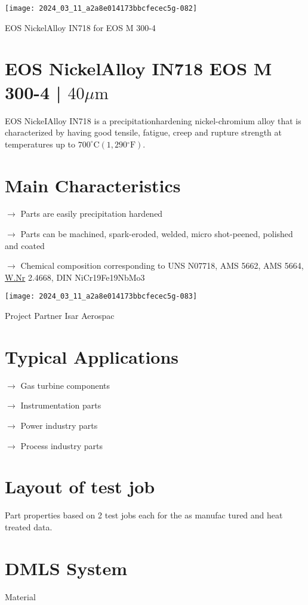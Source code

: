 \documentclass[10pt]{article}
\begin{document}
\begin{center}
\texttt{[image: 2024\_03\_11\_a2a8e014173bbcfecec5g-082]}
\end{center}

EOS NickelAlloy IN718 for EOS M 300-4

\section*{EOS NickelAlloy IN718 EOS M 300-4 | $40 \mu \mathrm{m}$}
EOS NickeIAlloy IN718 is a precipitationhardening nickel-chromium alloy that is characterized by having good tensile, fatigue, creep and rupture strength at temperatures up to $700^{\circ} \mathrm{C}\left(1,290{ }^{\circ} \mathrm{F}\right)$.

\section*{Main Characteristics}
$\longrightarrow$ Parts are easily precipitation hardened

$\longrightarrow$ Parts can be machined, spark-eroded, welded, micro shot-peened, polished and coated

$\longrightarrow$ Chemical composition corresponding to UNS N07718, AMS 5662, AMS 5664, \href{http://W.Nr}{W.Nr} 2.4668, DIN NiCr19Fe19NbMo3

\begin{center}
\texttt{[image: 2024\_03\_11\_a2a8e014173bbcfecec5g-083]}
\end{center}

Project Partner Isar Aerospac

\section*{Typical Applications}
$\longrightarrow$ Gas turbine components

$\longrightarrow$ Instrumentation parts

$\longrightarrow$ Power industry parts

$\longrightarrow$ Process industry parts

\section*{Layout of test job}
Part properties based on 2 test jobs each for the as manufac tured and heat treated data.

\section*{DMLS System}
Material
\end{document}
